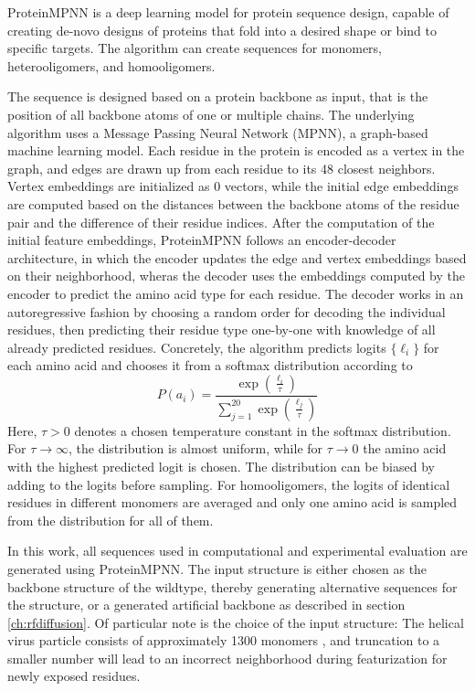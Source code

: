 ProteinMPNN \cite{PMPNN2022} is a deep learning model for protein sequence design, capable of creating de-novo designs of proteins that fold into a desired shape or bind to specific targets. The algorithm can create sequences for monomers, heterooligomers, and homooligomers. 

The sequence is designed based on a protein backbone as input, that is the position of all backbone atoms of one or multiple chains. The underlying algorithm uses a Message Passing Neural Network (MPNN), a graph-based machine learning model. Each residue in the protein is encoded as a vertex in the graph, and edges are drawn up from each residue to its 48 closest neighbors. Vertex embeddings are initialized as 0 vectors, while the initial edge embeddings are computed based on the distances between the backbone atoms of the residue pair and the difference of their residue indices. After the computation of the initial feature embeddings, ProteinMPNN follows an encoder-decoder architecture, in which the encoder updates the edge and vertex embeddings based on their neighborhood, wheras the decoder uses the embeddings computed by the encoder to predict the amino acid type for each residue. The decoder works in an autoregressive fashion by choosing a random order for decoding the individual residues, then predicting their residue type one-by-one with knowledge of all already predicted residues. Concretely, the algorithm predicts logits $\{\ell_i\}$ for each amino acid and chooses it from a softmax distribution according to
$$P(a_i) = \frac{\exp\left( \frac{\ell_i}{\tau} \right)}{\sum_{j=1}^{20} \exp\left( \frac{\ell_j}{\tau} \right)}$$
Here, $\tau>0$ denotes a chosen temperature constant in the softmax distribution. For $\tau\rightarrow\infty$, the distribution is almost uniform, while for $\tau\rightarrow 0$ the amino acid with the highest predicted logit is chosen. The distribution can be biased by adding to the logits before sampling. For homooligomers, the logits of identical residues in different monomers are averaged and only one amino acid is sampled from the distribution for all of them. 

In this work, all sequences used in computational and experimental evaluation are generated using ProteinMPNN. The input structure is either chosen as the backbone structure of the wildtype, thereby generating alternative sequences for the structure, or a generated artificial backbone as described in section \ref{ch:rfdiffusion}. Of particular note is the choice of the input structure: The helical virus particle consists of approximately 1300 monomers \cite{Grinzato2020}, and truncation to a smaller number will lead to an incorrect neighborhood during featurization for newly exposed residues. 

